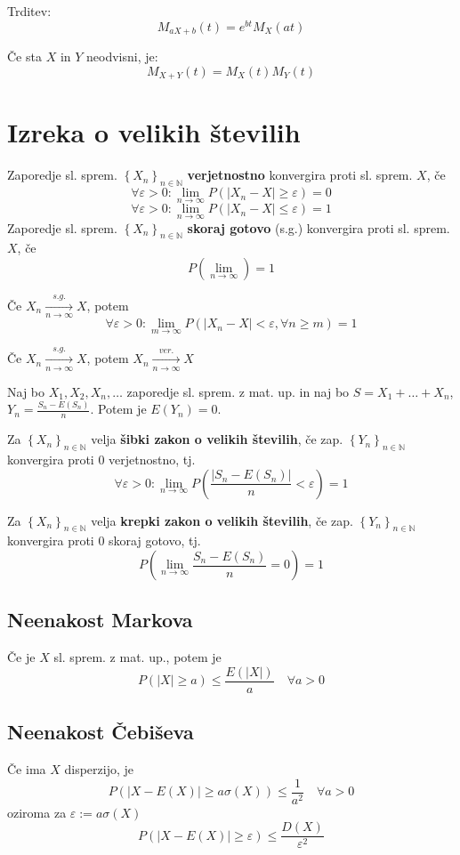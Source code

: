 \begin{multicols}{5}
Trditev:
\[M_{aX+b}(t) = e^{bt} M_X(at) \]

Če sta $X$ in $Y$ neodvisni, je:
\[ M_{X+Y} (t) = M_X(t) M_Y(t)\]

\section{Izreka o velikih številih}

Zaporedje sl. sprem. $\left\{X_n\right\}_{n\in \mathbb{N}}$ \textbf{verjetnostno} konvergira proti sl. sprem. $X$, če
\[\forall \varepsilon > 0: \lim_{n \to \infty} P(|X_n - X| \geq \varepsilon) = 0\]
\[\forall \varepsilon > 0: \lim_{n \to \infty} P(|X_n - X| \leq \varepsilon) = 1\]
Zaporedje sl. sprem. $\left\{X_n\right\}_{n\in \mathbb{N}}$ \textbf{skoraj gotovo} (s.g.) konvergira proti sl. sprem. $X$, če
\[ P(\lim_{n \to \infty}) = 1 \]

Če $X_n \xrightarrow[n \to \infty]{s.g.} X$, potem
\[\forall \varepsilon > 0: \lim_{m \to \infty} P(|X_n - X| < \varepsilon, \forall n \geq m) = 1\]

Če $X_n \xrightarrow[n \to \infty]{s.g.} X$, potem $X_n \xrightarrow[n \to \infty]{ver.} X$


Naj bo $X_1, X_2, X_n, \dots$ zaporedje sl. sprem. z mat. up. in naj bo $S = X_1 +\dots + X_n$, $Y_n = \frac{S_n - E(S_n)}{n}$. Potem je $E(Y_n) = 0$.

Za $\left\{ X_n \right\}_{n \in \mathbb{N}} $ velja \textbf{šibki zakon o velikih številih}, če zap. $\left\{ Y_n \right\}_{n \in \mathbb{N}}$
konvergira proti 0 verjetnostno, tj.
\[ \forall \varepsilon > 0: \lim_{n \to \infty} P\left(  \frac{|S_n - E(S_n)|}{n} < \varepsilon \right) = 1 \]

Za $\left\{ X_n \right\}_{n \in \mathbb{N}} $ velja \textbf{krepki zakon o velikih številih}, če zap. $\left\{ Y_n \right\}_{n \in \mathbb{N}}$
konvergira proti 0 skoraj gotovo, tj.
\[ P\left( \lim_{n \to \infty} \frac{S_n - E(S_n)}{n} = 0 \right) = 1 \]

\subsection{Neenakost Markova}
Če je $X$ sl. sprem. z mat. up., potem je
\[P(|X| \geq a) \leq \frac{E(|X|)}{a} \quad \forall a > 0\]

\subsection{Neenakost Čebiševa}
Če ima $X$ disperzijo, je
\[ P(|X - E(X)| \geq a \sigma(X)) \leq \frac{1}{a^2}  \quad \forall a > 0\]
oziroma za $\varepsilon := a \sigma(X)$
\[ P(|X-E(X)| \geq \varepsilon) \leq \frac{D(X)}{\varepsilon^2}\]


\end{multicols}
